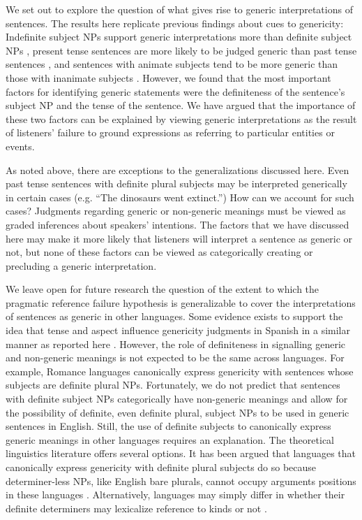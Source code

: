\documentclass[10pt,letterpaper]{article}
\begin{document}
We set out to explore the question of what gives rise to generic interpretations of sentences. The results here replicate previous findings about cues to genericity: Indefinite subject NPs support generic interpretations more than definite subject NPs \cite{Cimpian:2011, Gelman:2003}, present tense sentences are more likely to be judged generic than past tense sentences \cite{Cimpian:2011}, and sentences with animate subjects tend to be more generic than those with inanimate subjects \cite{Brandone:2009}. However, we found that the most important factors for identifying generic statements were the definiteness of the sentence's subject NP and the tense of the sentence. We have argued that the importance of these two factors can be explained by viewing generic interpretations as the result of listeners' failure to ground expressions as referring to particular entities or events.

As noted above, there are exceptions to the generalizations discussed here. Even past tense sentences with definite plural subjects may be interpreted generically in certain cases (e.g. ``The dinosaurs went extinct.'') How can we account for such cases? Judgments regarding generic or non-generic meanings must be viewed as graded inferences about speakers' intentions. The factors that we have discussed here may make it more likely that listeners will interpret a sentence as generic or not, but none of these factors can be viewed as categorically creating or precluding a generic interpretation.

We leave open for future research the question of the extent to which the pragmatic reference failure hypothesis is generalizable to cover the interpretations of sentences as generic in other languages. Some evidence exists to support the idea that tense and aspect influence genericity judgments in Spanish in a similar manner as reported here \cite{Perez-Leroux:2004}. However, the role of definiteness in signalling generic and non-generic meanings is not expected to be the same across languages. For example, Romance languages canonically express genericity with sentences whose subjects are definite plural NPs. Fortunately, we do not predict that sentences with definite subject NPs categorically have non-generic meanings and allow for the possibility of definite, even definite plural, subject NPs to be used in generic sentences in English. Still, the use of definite subjects to canonically express generic meanings in other languages requires an explanation. The theoretical linguistics literature offers several options. It has been argued that languages that canonically express genericity with definite plural subjects do so because determiner-less NPs, like English bare plurals, cannot occupy arguments positions in these languages \cite{Chierchia:1998}. Alternatively, languages may simply differ in whether their definite determiners may lexicalize reference to kinds or not \cite{Dayal:2004}.
\end{document}

